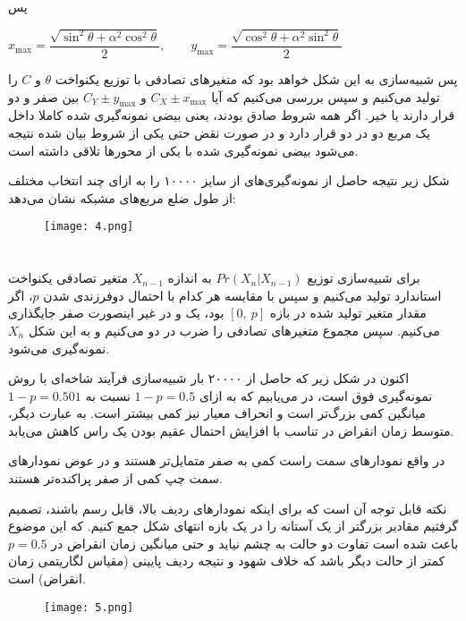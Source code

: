 \documentclass{scribe-cgenomics}
\begin{document}
پس

\begin{center}
$
x_{\max} = \dfrac{\sqrt{\sin^2 \theta + \alpha^2 \cos^2 \theta}}{2}, \qquad
y_{\max} = \dfrac{\sqrt{\cos^2 \theta + \alpha^2 \sin^2 \theta}}{2}
$
\end{center}

پس شبیه‌سازی به این شکل خواهد بود که متغیر‌های تصادفی با توزیع یکنواخت
$\theta$
و
$C$
را تولید می‌کنیم و سپس بررسی می‌کنیم که آیا
$C_X \pm x_{\max}$
و
$C_Y \pm y_{\max}$
بین صفر و دو قرار دارند یا خیر. اگر همه شروط صادق بودند، یعنی بیضی نمونه‌گیری شده کاملا داخل یک مربع دو  در دو قرار دارد و در صورت نقض حتی یکی از شروط بیان شده نتیجه می‌شود بیضی نمونه‌گیری شده با یکی از محورها تلاقی داشته است.

شکل زیر نتیجه حاصل از نمونه‌گیری‌های از سایز ۱۰۰۰۰ را به ازای چند انتخاب مختلف از طول ضلع مربع‌های مشبکه نشان می‌دهد:

\begin{figure}[h]\label{4}
\texttt{[image: 4.png]}
\centering
\end{figure}


\newpage
\section{}
برای شبیه‌سازی توزیع
$Pr(X_n | X_{n-1})$
به اندازه
$X_{n-1}$
متغیر تصادفی یکنواخت استاندارد تولید می‌کنیم و سپس با مقایسه هر کدام با احتمال دوفرزندی شدن
$p$،
اگر مقدار متغیر تولید شده در بازه
$[0,\ p]$
بود، یک و در غیر اینصورت صفر جایگذاری می‌کنیم. سپس مجموع متغیرهای تصادفی را ضرب در دو می‌کنیم و به این شکل
$X_n$
نمونه‌گیری می‌شود.


اکنون در شکل زیر که حاصل از ۲۰۰۰۰ بار شبیه‌سازی فرآیند شاخه‌ای با روش نمونه‌گیری فوق است، در می‌یابیم که به ازای
$1-p = 0.5$
نسبت به
$1-p = 0.501$
میانگین کمی بزرگ‌تر است و انحراف معیار نیز کمی بیشتر است. به عبارت دیگر، متوسط زمان انقراض در تناسب با افزایش احتمال عقیم بودن یک راس کاهش می‌یابد. 

در واقع نمودار‌های سمت راست کمی به صفر متمایل‌تر هستند و در عوض نمودار‌های سمت چپ کمی از صفر پراکنده‌تر هستند.

نکته قابل توجه آن است که برای اینکه نمودار‌های ردیف بالا، قابل رسم باشند، تصمیم گرفتیم مقادیر بزرگتر از یک آستانه را در یک بازه انتهای شکل جمع کنیم. که این موضوع باعث شده است تفاوت دو حالت به چشم نیاید و حتی میانگین زمان انقراض در
$p = 0.5$
کمتر از حالت دیگر باشد که خلاف شهود و نتیجه ردیف پایینی  (مقیاس لگاریتمی زمان انقراض) است.

\begin{figure}[h]\label{5}
\texttt{[image: 5.png]}
\centering
\end{figure}
\end{document}
